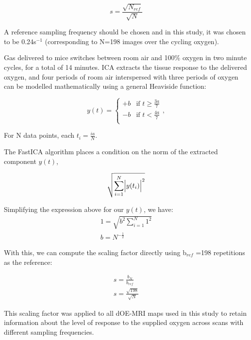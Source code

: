 \begin{equation}
s = \frac{\sqrt{N_{ref}}}{\sqrt{N}}
\label{correctionfactor}
\end{equation}

A reference sampling frequency should be chosen and in this study, it was chosen to be 0.24s$^{-1}$ (corresponding to N=198 images over the cycling oxygen).

Gas delivered to mice switches between room air and 100\% oxygen in two minute cycles, for a total of 14 minutes.
ICA extracts the tissue response to the delivered oxygen, and four periods of room air interspersed with three periods of oxygen can be modelled mathematically using a general Heaviside function:

\begin{equation}
y(t) =
  \begin{cases}
                                   +b & \text{if $t\geq \frac{3a}{7}$} \\
                                   -b & \text{if $t< \frac{4a}{7}$} \\
  \end{cases},
\end{equation}

For N data points, each $t_i = \frac{ia}{N}$.

The FastICA algorithm places a condition on the norm of the extracted component $y(t)$,

\begin{equation}
\sqrt{\sum_{i=1}^{N} \Bigl|y(t_i)\Bigr|^2} %
\end{equation}

Simplifying the expression above for our $y(t)$, we have:
\begin{align}
1 = \sqrt{b^2 \sum_{i=1}^{N} 1^2} \nonumber \\
b = N^{-\frac{1}{2}}
\end{align}

With this, we can compute the scaling factor directly using b$_{ref}$ =198 repetitions as the reference:

\begin{align}
s = \frac{b_{N}}{b_{ref}} \nonumber \\
s = \frac{\sqrt{198}}{\sqrt{N}} 
\end{align}

This scaling factor was applied to all dOE-MRI maps used in this study to retain information about the level of response to the supplied oxygen across scans with different sampling frequencies.

